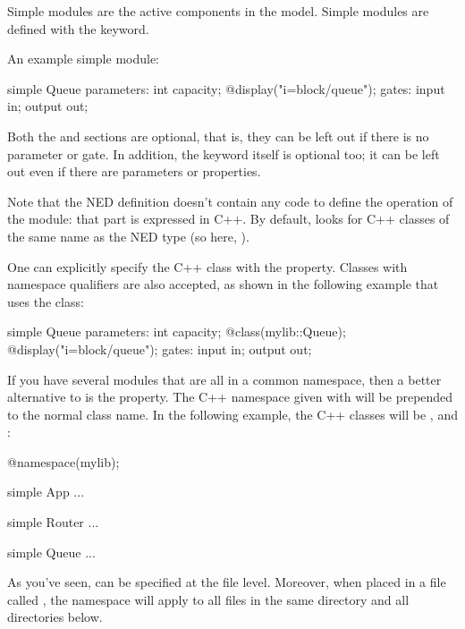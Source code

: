 Simple modules are the active components in the model.
Simple modules are defined with the  keyword.

An example simple module:

\begin{ned}
simple Queue
{
    parameters:
        int capacity;
        @display("i=block/queue");
    gates:
        input in;
        output out;
}
\end{ned}

Both the  and  sections are optional, that is,
they can be left out if there is no parameter or gate. In addition, the
 keyword itself is optional too; it can be left out
even if there are parameters or properties.

Note that the NED definition doesn't contain any code to define the
operation of the module: that part is expressed in C++. By default, {\opp}
looks for C++ classes of the same name as the NED type (so here, ).

One can explicitly specify the C++ class with the  property.
Classes with namespace qualifiers are also accepted, as shown in the following
example that uses the  class:

\begin{ned}
simple Queue
{
    parameters:
        int capacity;
        @class(mylib::Queue);
        @display("i=block/queue");
    gates:
        input in;
        output out;
}
\end{ned}

If you have several modules that are all in a common namespace, then a
better alternative to  is the  property. The
C++ namespace given with  will be prepended to the normal
class name. In the following example, the C++ classes will be
,  and :

\begin{ned}
@namespace(mylib);

simple App {
   ...
}

simple Router {
   ...
}

simple Queue {
   ...
}
\end{ned}

As you've seen,  can be specified at the file level. Moreover,
when placed in a file called , the namespace will apply to
all files in the same directory and all directories below.

